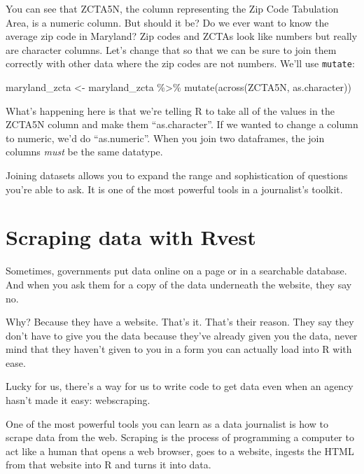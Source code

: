 \documentclass[
  letterpaper,
  DIV=11,
  numbers=noendperiod]{scrreprt}
\newenvironment{Shaded}{\begin{snugshade}}{\end{snugshade}}
\newcommand{\FunctionTok}[1]{\textcolor[rgb]{0.28,0.35,0.67}{#1}}
\newcommand{\NormalTok}[1]{\textcolor[rgb]{0.00,0.23,0.31}{#1}}
\newcommand{\OtherTok}[1]{\textcolor[rgb]{0.00,0.23,0.31}{#1}}
\newcommand{\SpecialCharTok}[1]{\textcolor[rgb]{0.37,0.37,0.37}{#1}}
\begin{document}
You can see that ZCTA5N, the column representing the Zip Code Tabulation
Area, is a numeric column. But should it be? Do we ever want to know the
average zip code in Maryland? Zip codes and ZCTAs look like numbers but
really are character columns. Let's change that so that we can be sure
to join them correctly with other data where the zip codes are not
numbers. We'll use \texttt{mutate}:

\begin{Shaded}
\begin{Highlighting}[]
\NormalTok{maryland\_zcta }\OtherTok{\textless{}{-}}\NormalTok{ maryland\_zcta }\SpecialCharTok{\%\textgreater{}\%} \FunctionTok{mutate}\NormalTok{(}\FunctionTok{across}\NormalTok{(ZCTA5N, as.character))}
\end{Highlighting}
\end{Shaded}

What's happening here is that we're telling R to take all of the values
in the ZCTA5N column and make them ``as.character''. If we wanted to
change a column to numeric, we'd do ``as.numeric''. When you join two
dataframes, the join columns \emph{must} be the same datatype.

Joining datasets allows you to expand the range and sophistication of
questions you're able to ask. It is one of the most powerful tools in a
journalist's toolkit.


\hypertarget{scraping-data-with-rvest}{%
\chapter{Scraping data with Rvest}\label{scraping-data-with-rvest}}

Sometimes, governments put data online on a page or in a searchable
database. And when you ask them for a copy of the data underneath the
website, they say no.

Why? Because they have a website. That's it. That's their reason. They
say they don't have to give you the data because they've already given
you the data, never mind that they haven't given to you in a form you
can actually load into R with ease.

Lucky for us, there's a way for us to write code to get data even when
an agency hasn't made it easy: webscraping.

One of the most powerful tools you can learn as a data journalist is how
to scrape data from the web. Scraping is the process of programming a
computer to act like a human that opens a web browser, goes to a
website, ingests the HTML from that website into R and turns it into
data.
\end{document}
